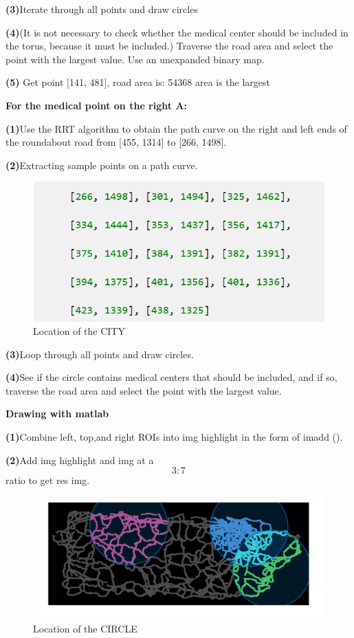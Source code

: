 \documentclass{article} %
\begin{document}
\textbf{(3)}Iterate through all points and draw circles


\textbf{(4)}(It is not necessary to check whether the medical center should be included in the torus, because it must be included.) Traverse the road area and select the point with the largest value. Use an unexpanded binary map.


\textbf{(5)} Get point [141, 481], road area is: 54368 area is the largest

\textbf{For the medical point on the right A:}


\textbf{(1)}Use the RRT algorithm to obtain the path curve on the right and left ends of the roundabout road from [455, 1314] to [266, 1498].


\textbf{(2)}Extracting sample points on a path curve.


\begin{figure}[h]
    \centering
    \includegraphics[scale=0.7]{63.png}
    \caption{Location of the CITY}
\end{figure}


\textbf{(3)}Loop through all points and draw circles.


\textbf{(4)}See if the circle contains medical centers that should be included, and if so, traverse the road area and select the point with the largest value.


\textbf{Drawing with matlab}


\textbf{(1)}Combine left, top,and right ROIs into img highlight in the form of imadd ().


\textbf{(2)}Add img highlight and img at a$$3: 7$$ratio to get res img.


\begin{figure}[h]
    \centering
    \includegraphics[scale=0.3]{64.png}
    \caption{Location of the CIRCLE}
\end{figure}
\end{document}
